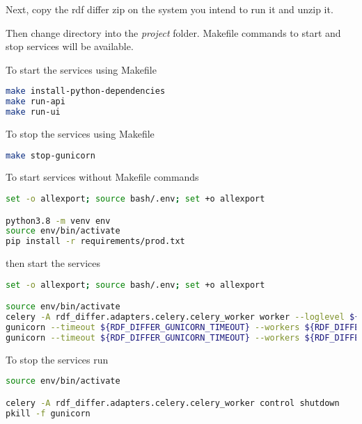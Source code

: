 Next, copy the rdf differ zip on the system you intend to run it and unzip it.

Then change directory into the \textit{project} folder. Makefile commands to start and stop services will be available. 	

To start the services using Makefile

\begin{lstlisting}[language=bash,]
make install-python-dependencies
make run-api
make run-ui
\end{lstlisting}

To stop the services using Makefile

\begin{lstlisting}[language=bash,]
make stop-gunicorn
\end{lstlisting}

To start services without Makefile commands

\begin{lstlisting}[language=bash,]
set -o allexport; source bash/.env; set +o allexport

python3.8 -m venv env
source env/bin/activate
pip install -r requirements/prod.txt
\end{lstlisting}

then start the services

\begin{lstlisting}[language=bash,]
set -o allexport; source bash/.env; set +o allexport

source env/bin/activate
celery -A rdf_differ.adapters.celery.celery_worker worker --loglevel ${RDF_DIFFER_LOG_LEVEL} --logfile ${RDF_DIFFER_CELERY_LOGS} --detach
gunicorn --timeout ${RDF_DIFFER_GUNICORN_TIMEOUT} --workers ${RDF_DIFFER_GUNICORN_API_WORKERS} --bind 0.0.0.0:${RDF_DIFFER_API_PORT} --reload rdf_differ.entrypoints.api.run:app --log-file ${RDF_DIFFER_API_LOGS} --log-level ${RDF_DIFFER_LOG_LEVEL} --daemon
gunicorn --timeout ${RDF_DIFFER_GUNICORN_TIMEOUT} --workers ${RDF_DIFFER_GUNICORN_UI_WORKERS} --bind 0.0.0.0:${RDF_DIFFER_UI_PORT} --reload rdf_differ.entrypoints.ui.run:app --log-file ${RDF_DIFFER_UI_LOGS} --log-level ${RDF_DIFFER_LOG_LEVEL} --daemon
\end{lstlisting}

To stop the services run

\begin{lstlisting}[language=bash,]
source env/bin/activate

celery -A rdf_differ.adapters.celery.celery_worker control shutdown
pkill -f gunicorn
\end{lstlisting}